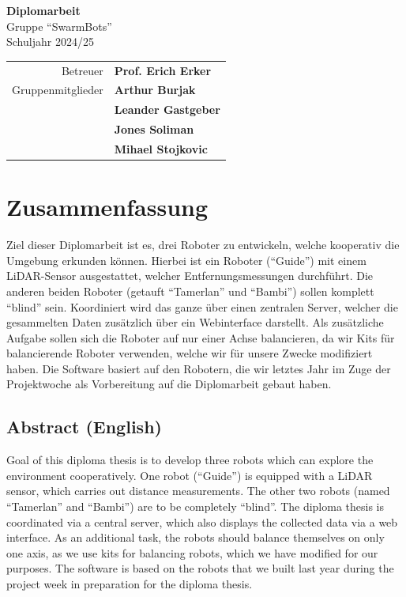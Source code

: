 \documentclass[12pt]{article}
\begin{document}
	
	
	\begin{titlepage}
		\centering
		\Huge
		\textbf{Diplomarbeit} \\
		\huge
		Gruppe ``SwarmBots'' \\
		Schuljahr 2024/25 \\
		\vspace{2cm}
		\Large
		\begin{tabular}{r @{: } >{\bfseries} l}
			Betreuer & Prof. Erich Erker\\
			Gruppenmitglieder & Arthur Burjak \\
			& Leander Gastgeber \\
			& Jones Soliman \\
			& Mihael Stojkovic
	\end{tabular}
	\end{titlepage}
	\newpage
	
	\tableofcontents
	\newpage
	
	\section{Zusammenfassung}
	Ziel dieser Diplomarbeit ist es, drei Roboter zu entwickeln,
	welche kooperativ die Umgebung erkunden können.
	Hierbei ist ein Roboter (``Guide'') mit einem LiDAR-Sensor ausgestattet,
	welcher Entfernungsmessungen durchführt.
	Die anderen beiden Roboter (getauft ``Tamerlan'' und ``Bambi'')
	sollen komplett ``blind'' sein.
	Koordiniert wird das ganze über einen zentralen Server,
	welcher die gesammelten Daten zusätzlich über ein Webinterface darstellt.
	Als zusätzliche Aufgabe sollen sich die Roboter auf nur einer Achse balancieren,
	da wir Kits für balancierende Roboter verwenden,
	welche wir für unsere Zwecke modifiziert haben.
	Die Software basiert auf den Robotern,
	die wir letztes Jahr im Zuge der Projektwoche als Vorbereitung auf die Diplomarbeit gebaut haben.
	\subsection{Abstract (English)}
	Goal of this diploma thesis is to develop three robots which
	can explore the environment cooperatively.
    One robot (``Guide'') is equipped with a LiDAR sensor,
    which carries out distance measurements.
	The other two robots (named ``Tamerlan'' and ``Bambi'')
    are to be completely ``blind''.
	The diploma thesis is coordinated via a central server,
    which also displays the collected data via a web interface.
	As an additional task, the robots should balance themselves on only one axis,
    as we use kits for balancing robots,
    which we have modified for our purposes.
    The software is based on the robots
    that we built last year during the project week in preparation for the diploma thesis.
\end{document}
